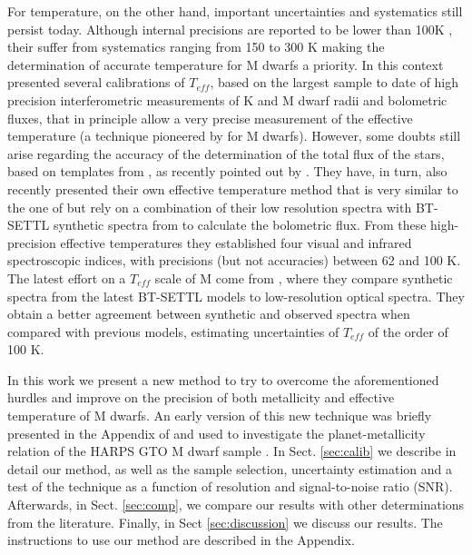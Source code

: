 \documentclass[referee]{aa}
\begin{document}
For temperature, on the other hand, important uncertainties and systematics still persist today. Although internal precisions are reported to be lower than 100K \citep[e.g.][]{Casagrande-2008,Rojas-Ayala-2012,Boyajian-2012}, their suffer from systematics ranging from 150 to 300 K making the determination of accurate temperature for M dwarfs a priority. In this context \citet{Boyajian-2012} presented several calibrations of $T_{eff}$, based on the largest sample to date of high precision interferometric measurements of K and M dwarf radii and bolometric fluxes, that in principle allow a very precise measurement of the effective temperature (a technique pioneered by \citet{Segransan-2003} for M dwarfs). However, some doubts still arise regarding the accuracy of the determination of the total flux of the stars, based on templates from \citet{Pickles-1998}, as recently pointed out by \citet[][]{Mann-2013b}. They have, in turn, also recently presented their own effective temperature method that is very similar to the one of \citet{Boyajian-2012} but rely on a combination of their low resolution spectra with BT-SETTL synthetic spectra from \citet{Allard-2011} to calculate the bolometric flux. From these high-precision effective temperatures they established four visual and infrared spectroscopic indices, with precisions (but not accuracies) between 62 and 100 K. The latest effort on a $T_{eff}$ scale of M come from \citet{Rajpurohit-2013a}, where they compare synthetic spectra from the latest BT-SETTL models \citep{Allard-2012} to low-resolution optical spectra. They obtain a better agreement between synthetic and observed spectra when compared with previous models, estimating uncertainties of $T_{eff}$ of the order of 100 K. 





In this work we present a new method to try to overcome the aforementioned hurdles and improve on the precision of both metallicity and effective temperature of M dwarfs. An early version of this new technique was briefly presented in the Appendix of \citet{Neves-2013} and used to investigate the planet-metallicity relation of the HARPS GTO M dwarf sample \citep{Bonfils-2013}. In Sect. \ref{sec:calib} we describe in detail our method, as well as the sample selection, uncertainty estimation and a test of the technique as a function of resolution and signal-to-noise ratio (SNR). Afterwards, in Sect. \ref{sec:comp}, we compare our results with other determinations from the literature. Finally, in Sect \ref{sec:discussion} we discuss our results. The instructions to use our method are described in the Appendix. 
\end{document}

